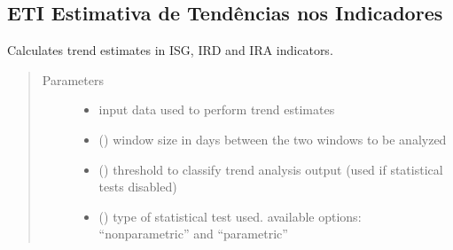 \documentclass[letterpaper,10pt,english]{sphinxmanual}
\begin{document}
\subsection{ETI \sphinxhyphen{} Estimativa de Tendências nos Indicadores}
\label{\detokenize{algorithms:eti-estimativa-de-tendencias-nos-indicadores}}
\sphinxAtStartPar
{}

\label{\detokenize{algorithms:module-algorithms.eti.eti}}

\begin{fulllineitems}
\label{\detokenize{algorithms:algorithms.eti.eti.calc_eti_all}}
\sphinxAtStartPar
Calculates trend estimates in ISG, IRD and IRA indicators.
\begin{quote}\begin{description}
\item[{Parameters}] \leavevmode\begin{itemize}
\item {} 
\sphinxAtStartPar
{} \textendash{} input data used to perform trend estimates

\item {} 
\sphinxAtStartPar
{} () \textendash{} window size in days between the two windows to be analyzed

\item {} 
\sphinxAtStartPar
{} () \textendash{} threshold to classify trend analysis output (used if statistical tests disabled)

\item {} 
\sphinxAtStartPar
{} () \textendash{} type of statistical test used. available options: “nonparametric” and “parametric”


\end{itemize}
\end{description}
\end{quote}
\end{fulllineitems}
\end{document}
